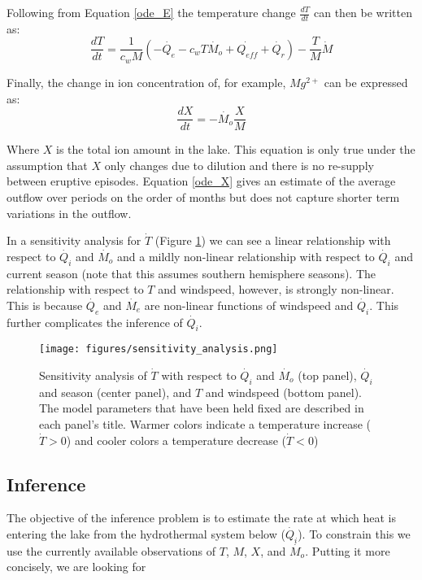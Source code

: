 \documentclass{bmcart}
\begin{document}
Following from Equation \ref{ode_E} the temperature change $\frac{dT}{dt}$ can then be written as:
\begin{equation}\label{ode_T}
	\frac{dT}{dt}=\frac{1}{c_wM}\left(-\dot{Q_e} - c_wT\dot{M_o} + \dot{Q_{eff}} + \dot{Q_r}\right )
	-\frac{T}{M}\dot{M}
\end{equation}

Finally, the change in ion concentration of, for example, $Mg^{2+}$ can be expressed as:
\begin{equation}\label{ode_X}
	\frac{dX}{dt}=-\dot{M_o}\frac{X}{M}
\end{equation}

Where $X$ is the total ion amount in the lake. This equation is only true under
the assumption that $X$ only changes due to dilution and there is no re-supply
between eruptive episodes. Equation \ref{ode_X} gives an estimate of the average
outflow over periods on the order of months but does not capture shorter term
variations in the outflow.

In a sensitivity analysis for $\dot{T}$ (Figure \ref{sens}) we can see a linear
relationship with respect to $\dot{Q_i}$ and $\dot{M_o}$ and a mildly
non-linear relationship with respect to $\dot{Q_i}$ and current season
(note that this assumes southern hemisphere seasons). The relationship with respect
to $T$ and windspeed, however, is strongly non-linear. This is because $\dot{Q_e}$
and $\dot{M_e}$ are non-linear functions of windspeed and $\dot{Q_i}$. This further 
complicates the inference of $\dot{Q_i}$.

\begin{figure}
    \texttt{[image: figures/sensitivity\_analysis.png]}  
    \caption{Sensitivity analysis of $\dot{T}$ with respect to $\dot{Q_i}$ 
             and $\dot{M_o}$ (top panel), $\dot{Q_i}$ and season 
             (center panel), and $T$ and windspeed (bottom panel). The model
              parameters that have been held fixed are described in each 
              panel's title. Warmer colors indicate a temperature increase
              ($\dot{T} > 0$) and cooler colors a temperature decrease
              ($\dot{T} < 0$)}
      \label{sens}
\end{figure}
    

\subsection{Inference}\label{inf}

The objective of the inference problem is to estimate the rate at which heat
is entering the lake from the hydrothermal system below ($\dot{Q_i}$).
To constrain this we use the currently available observations of $T$, $M$,
$X$, and $\dot{M_o}$. Putting it more concisely, we are looking for 
\end{document}
